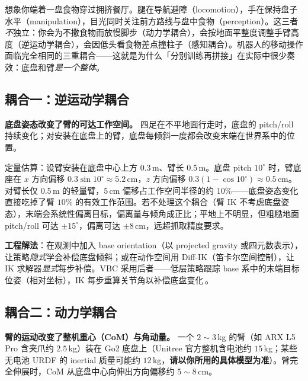 \begin{insight}\label{ins:rlmc-lm-restaurant}
想象你端着一盘食物穿过拥挤餐厅。腿在导航避障（locomotion），手在保持盘子水平（manipulation），目光同时关注前方路线与盘中食物（perception）。这三者\emph{不}独立：你会为不撒食物而放慢脚步（动力学耦合），会按地面平整度调整手臂高度（逆运动学耦合），会因低头看食物差点撞柱子（感知耦合）。机器人的移动操作面临完全相同的三重耦合——这就是为什么「分别训练再拼接」在实际中很少奏效：底盘和臂\emph{是一个整体}。
\end{insight}

\subsection{耦合一：逆运动学耦合}
\label{sec:rlmc-lm-ikcoupling}

\textbf{底盘姿态改变了臂的可达工作空间。} 四足在不平地面行走时，底盘的 pitch/roll 持续变化；对安装在底盘上的臂，底盘每倾斜一度都会改变末端在世界系中的位置。

定量估算：设臂安装在底盘中心上方 $0.3\,$m、臂长 $0.5\,$m。底盘 pitch $10^\circ$ 时，臂底座在 $x$ 方向偏移 $0.3\sin 10^\circ\approx 5.2\,$cm，$z$ 方向偏移 $0.3(1-\cos 10^\circ)\approx 0.5\,$cm。对臂长仅 $0.5\,$m 的轻量臂，$5\,$cm 偏移占工作空间半径的约 $10\%$——底盘姿态变化直接吃掉了臂 $10\%$ 的有效工作范围。若不处理这个耦合（臂 IK 不考虑底盘姿态），末端会系统性偏离目标，偏离量与倾角成正比；平地上不明显，但粗糙地面 pitch/roll 可达 $\pm15^\circ$，偏离可达 $\pm8\,$cm，远超抓取精度要求。

\textbf{工程解法}：在观测中加入 base orientation（以 projected gravity 或四元数表示），让策略\emph{隐式}学会补偿底盘倾斜；或在动作空间用 Diff-IK（笛卡尔空间控制），让 IK 求解器\emph{显式}每步补偿。VBC 采用后者——低层策略跟踪 base 系中的末端目标位姿（相对坐标），IK 每步重算关节角以补偿底盘变化\,\cite{liu2024vbc}。

\subsection{耦合二：动力学耦合}
\label{sec:rlmc-lm-dyncoupling}

\textbf{臂的运动改变了整机重心（CoM）与角动量。} 一个 $2\!\sim\!3\,$kg 的臂（如 ARX L5 Pro 含夹爪约 $2.5\,$kg）装在 Go2 底盘上（Unitree 官方整机含电池约 $15\,$kg；某些无电池 URDF 的 inertial 质量可能约 $12\,$kg，\textbf{请以你所用的具体模型为准}）。臂完全伸展时，CoM 从底盘中心向伸出方向偏移约 $5\!\sim\!8\,$cm。


